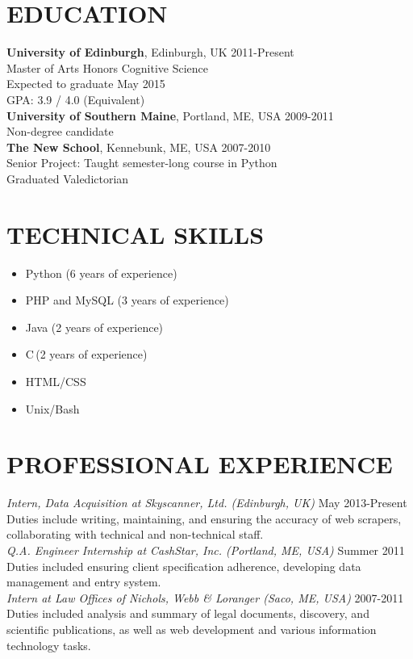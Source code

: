 \documentclass[line, margin]{res}
\newcommand{\CS}{C\nolinebreak\hspace{-.05em}\raisebox{.6ex}{\scriptsize\bf \#}}
\begin{document}
\address{24 Lutton Place\\ Edinburgh, Scotland EH8 9PE | 001 44 7719 663016 | chase@chasestevens.com}

\begin{resume}
\section{EDUCATION}
\textbf{University of Edinburgh}, Edinburgh, UK \hfill 2011-Present\\
Master of Arts Honors Cognitive Science \\
Expected to graduate May 2015 \\
GPA: 3.9 / 4.0 (Equivalent) \\[5pt]
\textbf{University of Southern Maine}, Portland, ME, USA \hfill 2009-2011\\
Non-degree candidate\\[5pt]
\textbf{The New School}, Kennebunk, ME, USA \hfill 2007-2010\\
Senior Project: Taught semester-long course in Python \\
Graduated Valedictorian

\section{TECHNICAL SKILLS}
\begin{itemize}[leftmargin=10pt]
\item Python (6 years of experience)
\item PHP and MySQL (3 years of experience)
\item Java (2 years of experience)
\item \CS \,(2 years of experience)
\item HTML/CSS
\item Unix/Bash
\end{itemize}

\section{PROFESSIONAL EXPERIENCE}
\textit{Intern, Data Acquisition at Skyscanner, Ltd. (Edinburgh, UK)} \hfill May 2013-Present \\
Duties include writing, maintaining, and ensuring the accuracy of web scrapers, collaborating with technical and non-technical staff.\\[5pt]
\textit{Q.A. Engineer Internship at CashStar, Inc. (Portland, ME, USA)} \hfill Summer 2011 \\
Duties included ensuring client specification adherence, developing data management and entry system.\\[5pt]
\textit{Intern at Law Offices of Nichols, Webb \& Loranger (Saco, ME, USA)} \hfill 2007-2011 \\
Duties included analysis and summary of legal documents, discovery, and scientific publications, as well as web development and various information technology tasks. 


\end{resume}
\end{document}
